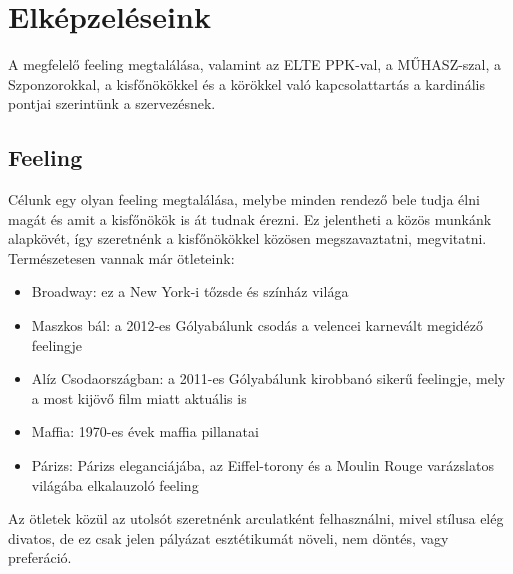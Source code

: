 \chapter{Elképzeléseink}\label{sect:Visions}
A megfelelő feeling megtalálása, valamint az ELTE PPK-val, a MŰHASZ-szal, a Szponzorokkal, a kisfőnökökkel és a körökkel való kapcsolattartás a kardinális pontjai szerintünk a szervezésnek.

\section{Feeling}
\hspace{2mm} Célunk egy olyan feeling megtalálása, melybe minden rendező bele tudja élni magát és amit a kisfőnökök is át tudnak érezni. Ez jelentheti a közös munkánk alapkövét, így szeretnénk a kisfőnökökkel közösen megszavaztatni, megvitatni. Természetesen vannak már ötleteink:
\begin{itemize}
	\item Broadway: ez a New York-i tőzsde és színház világa
	\item Maszkos bál: a 2012-es Gólyabálunk csodás a velencei karnevált megidéző feelingje 
	\item Alíz Csodaországban: a 2011-es Gólyabálunk kirobbanó sikerű feelingje, mely a most kijövő film miatt aktuális is
	\item Maffia: 1970-es évek maffia pillanatai
	\item Párizs: Párizs eleganciájába, az Eiffel-torony és a Moulin Rouge varázslatos világába elkalauzoló feeling
\end{itemize}
\hspace{2mm} Az ötletek közül az utolsót szeretnénk arculatként felhasználni, mivel stílusa elég divatos, de ez csak jelen pályázat esztétikumát növeli, nem döntés, vagy preferáció.

